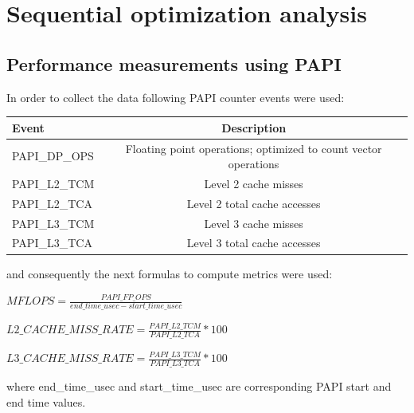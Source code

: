 \documentclass{article}
\begin{document}
\section{Sequential optimization analysis}

\subsection{Performance measurements using PAPI}
In order to collect the data following PAPI counter events were used:\\
\begin{center}
\begin{tabular}{l|c}
	\hline
	Event & Description \\
	\hline
	PAPI\_DP\_OPS & Floating point operations; optimized to count vector operations \\
	PAPI\_L2\_TCM & Level 2 cache misses \\
	PAPI\_L2\_TCA & Level 2 total cache accesses \\
	PAPI\_L3\_TCM & Level 3 cache misses \\
	PAPI\_L3\_TCA & Level 3 total cache accesses \\
\end{tabular}
\end{center}
and consequently the next formulas to compute metrics were used:
\begin{center}
	$MFLOPS=\frac{PAPI\_FP\_OPS}{end\_time\_usec - start\_time\_usec}$
\end{center}
\begin{center}
	$L2\_CACHE\_MISS\_RATE=\frac{PAPI\_L2\_TCM}{PAPI\_L2\_TCA}*100$
\end{center}
\begin{center}
	$L3\_CACHE\_MISS\_RATE=\frac{PAPI\_L3\_TCM}{PAPI\_L3\_TCA}*100$
\end{center}
where end\_time\_usec and start\_time\_usec are corresponding PAPI start and end time values.
\end{document}
